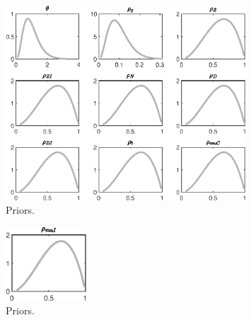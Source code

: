 \begin{figure}[H]
\centering
\includegraphics[width=0.80\textwidth]{BRS_sectoral_wo_vcu/graphs/BRS_sectoral_wo_vcu_Priors4}
\caption{Priors.}\label{Fig:Priors:4}
\end{figure}
\begin{figure}[H]
\centering
\includegraphics[width=0.27\textwidth]{BRS_sectoral_wo_vcu/graphs/BRS_sectoral_wo_vcu_Priors5}
\caption{Priors.}\label{Fig:Priors:5}
\end{figure}
 
